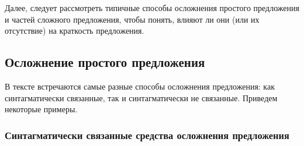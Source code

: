 \documentclass{kursa4}
\begin{document}
        Далее, следует рассмотреть типичные способы осложнения простого предложения и частей сложного предложения, чтобы понять, влияют ли они (или их отсутствие) на краткость предложения. \subsection{Осложнение простого предложения}

        В тексте встречаются самые разные способы осложнения предложения: как синтагматически связанные, так и синтагматически не связанные. Приведем некоторые примеры. \subsubsection{Синтагматически связанные средства осложнения предложения}
\end{document}
